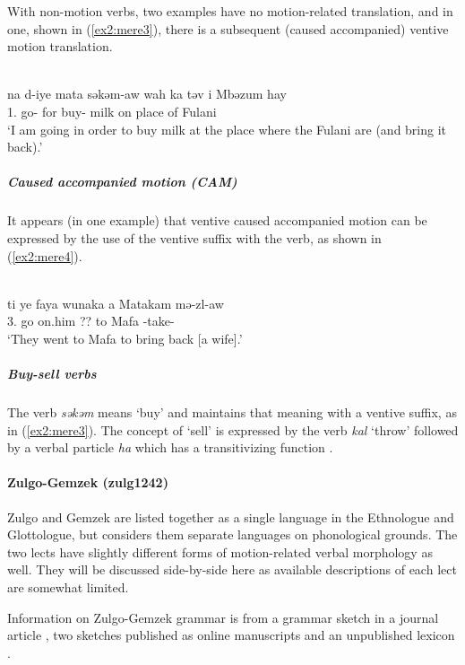 With non-motion verbs, two examples have no motion-related translation, and in one, shown in (\ref{ex2:mere3}), there is a subsequent (caused accompanied) ventive motion translation.

\ea\label{ex2:mere3}
 \\
\gll  na d-iye mata səkəm-aw wah ka təv i Mbəzum hay	\\
1. go- for buy- milk on place of Fulani 	\\
\glt `I am going in order to buy milk at the place where the Fulani are (and bring it back).'
\z 

\subparagraph{Caused accompanied motion (CAM)}

It appears (in one example) that ventive caused accompanied motion can be expressed by the use of the ventive suffix with the verb, as shown in (\ref{ex2:mere4}).

\ea\label{ex2:mere4}
 \\
\gll  ti ye faya wunaka a Matakam mə-zl-aw \\
3. go on.him ?? to Mafa -take- \\
\glt `They went to Mafa to bring back [a wife].'
\z 

\subparagraph{Buy-sell verbs}

The verb \textit{səkəm} means `buy' and maintains that meaning with a ventive suffix, as in (\ref{ex2:mere3}). The concept of `sell' is expressed by the verb \textit{kal} `throw' followed by a verbal particle \textit{ha} which has a transitivizing function \citep[14]{gravinaVerbPhraseMerey2007}.

\paragraph*{Zulgo-Gemzek (zulg1242)} \label{zulg}

Zulgo and Gemzek are listed together as a single language in the Ethnologue and Glottologue, but \citet[5]{gravinaOutlineSketchGemzek2005} considers them separate languages on phonological grounds. The two lects have slightly different forms of motion-related verbal morphology as well. They will be discussed side-by-side here as available descriptions of each lect are somewhat limited. 

Information on Zulgo-Gemzek grammar is from a grammar sketch in a journal article \citep{hallerVerbalComplexZulgo1981}, two sketches published as online manuscripts \citep{gravinaOutlineSketchGemzek2005,scherrerOverviewGemzekNarrative2012} and an unpublished lexicon \citep{amadouZulgoLexicon1986}.

